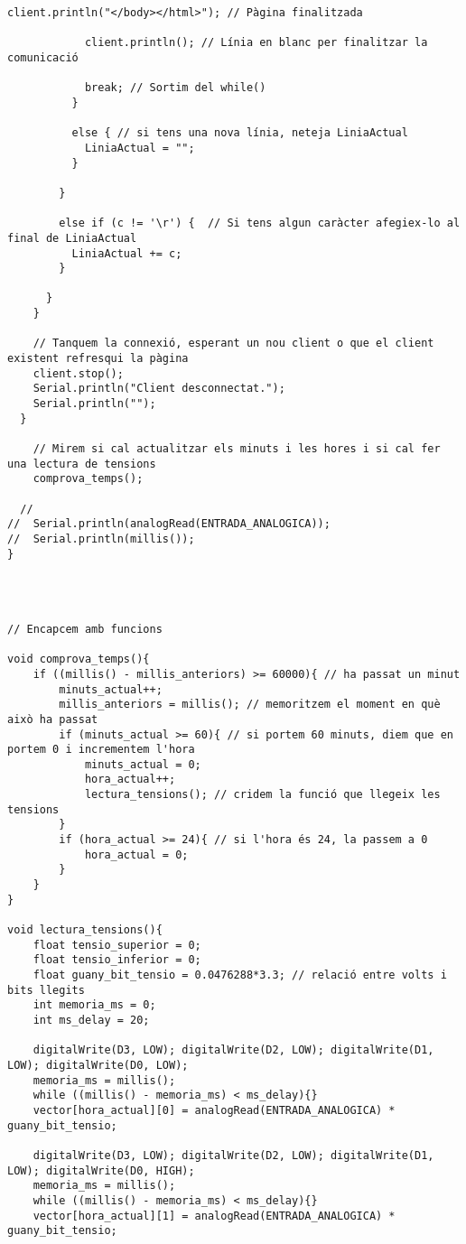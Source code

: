 \begin{lstlisting}[style=myArduino]
            client.println("</body></html>"); // Pàgina finalitzada
            
            client.println(); // Línia en blanc per finalitzar la comunicació
            
            break; // Sortim del while()
          } 
          
          else { // si tens una nova línia, neteja LiniaActual
            LiniaActual = "";
          }
          
        } 
       
        else if (c != '\r') {  // Si tens algun caràcter afegiex-lo al final de LiniaActual
          LiniaActual += c;   
        }
        
      }
    }

    // Tanquem la connexió, esperant un nou client o que el client existent refresqui la pàgina
    client.stop();
    Serial.println("Client desconnectat.");
    Serial.println("");
  }

    // Mirem si cal actualitzar els minuts i les hores i si cal fer una lectura de tensions
    comprova_temps();

  //
//  Serial.println(analogRead(ENTRADA_ANALOGICA));
//  Serial.println(millis());
}




// Encapcem amb funcions

void comprova_temps(){
    if ((millis() - millis_anteriors) >= 60000){ // ha passat un minut
        minuts_actual++;
        millis_anteriors = millis(); // memoritzem el moment en què això ha passat
        if (minuts_actual >= 60){ // si portem 60 minuts, diem que en portem 0 i incrementem l'hora
            minuts_actual = 0;
            hora_actual++;
            lectura_tensions(); // cridem la funció que llegeix les tensions
        }
        if (hora_actual >= 24){ // si l'hora és 24, la passem a 0
            hora_actual = 0;  
        }
    }
}

void lectura_tensions(){
    float tensio_superior = 0;
    float tensio_inferior = 0;
    float guany_bit_tensio = 0.0476288*3.3; // relació entre volts i bits llegits
    int memoria_ms = 0;
    int ms_delay = 20;
    
    digitalWrite(D3, LOW); digitalWrite(D2, LOW); digitalWrite(D1, LOW); digitalWrite(D0, LOW);
    memoria_ms = millis();
    while ((millis() - memoria_ms) < ms_delay){}
    vector[hora_actual][0] = analogRead(ENTRADA_ANALOGICA) * guany_bit_tensio;

    digitalWrite(D3, LOW); digitalWrite(D2, LOW); digitalWrite(D1, LOW); digitalWrite(D0, HIGH);
    memoria_ms = millis();
    while ((millis() - memoria_ms) < ms_delay){}
    vector[hora_actual][1] = analogRead(ENTRADA_ANALOGICA) * guany_bit_tensio;


\end{lstlisting}
